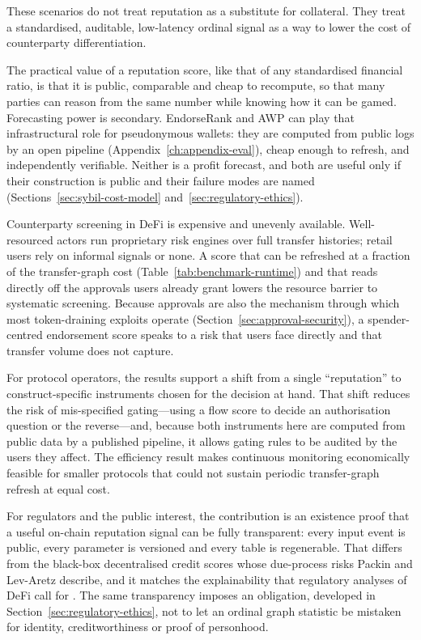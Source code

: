 These scenarios do not treat reputation as a substitute for collateral. They treat a standardised, auditable, low-latency ordinal signal as a way to lower the cost of counterparty differentiation.


The practical value of a reputation score, like that of any standardised financial ratio, is that it is public, comparable and cheap to recompute, so that many parties can reason from the same number while knowing how it can be gamed. Forecasting power is secondary. EndorseRank and AWP can play that infrastructural role for pseudonymous wallets: they are computed from public logs by an open pipeline (Appendix~\ref{ch:appendix-eval}), cheap enough to refresh, and independently verifiable. Neither is a profit forecast, and both are useful only if their construction is public and their failure modes are named (Sections~\ref{sec:sybil-cost-model} and~\ref{sec:regulatory-ethics}).


Counterparty screening in DeFi is expensive and unevenly available. Well-resourced actors run proprietary risk engines over full transfer histories; retail users rely on informal signals or none. A score that can be refreshed at a fraction of the transfer-graph cost (Table~\ref{tab:benchmark-runtime}) and that reads directly off the approvals users already grant lowers the resource barrier to systematic screening. Because approvals are also the mechanism through which most token-draining exploits operate (Section~\ref{sec:approval-security}), a spender-centred endorsement score speaks to a risk that users face directly and that transfer volume does not capture.

For protocol operators, the results support a shift from a single ``reputation'' to construct-specific instruments chosen for the decision at hand. That shift reduces the risk of mis-specified gating---using a flow score to decide an authorisation question or the reverse---and, because both instruments here are computed from public data by a published pipeline, it allows gating rules to be audited by the users they affect. The efficiency result makes continuous monitoring economically feasible for smaller protocols that could not sustain periodic transfer-graph refresh at equal cost.

For regulators and the public interest, the contribution is an existence proof that a useful on-chain reputation signal can be fully transparent: every input event is public, every parameter is versioned and every table is regenerable. That differs from the black-box decentralised credit scores whose due-process risks Packin and Lev-Aretz describe, and it matches the explainability that regulatory analyses of DeFi call for . The same transparency imposes an obligation, developed in Section~\ref{sec:regulatory-ethics}, not to let an ordinal graph statistic be mistaken for identity, creditworthiness or proof of personhood.

